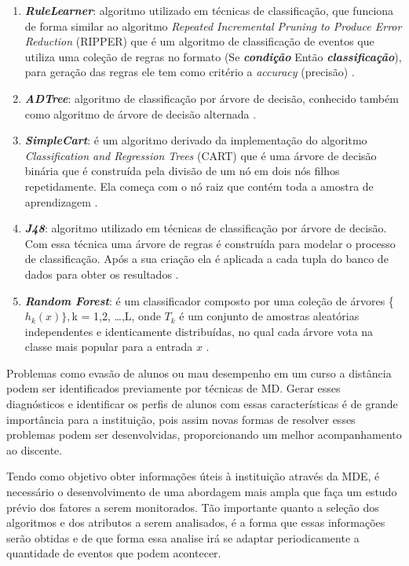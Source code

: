 \begin{enumerate}
\item \textbf{\textit{RuleLearner}}: algoritmo utilizado em técnicas de classificação, que funciona de forma similar ao algoritmo \textit{Repeated Incremental Pruning to Produce Error Reduction} (RIPPER) que é um algoritmo de classificação de eventos que utiliza uma coleção de regras no formato (Se \textbf{\textit{condição}} Então \textbf{\textit{classificação}}), para geração das regras ele tem como critério a \textit{accuracy} (precisão) \cite{cohen1995fast}.
\item \textbf{\textit{ADTree}}: algoritmo de classificação por árvore de decisão, conhecido também como algoritmo de árvore de decisão alternada \cite{freund1999alternating}.
\item \textbf{\textit{SimpleCart}}: é um algoritmo derivado da implementação do algoritmo \textit{Classification and Regression Trees} (CART) que é uma árvore de decisão binária que é construída pela divisão de um nó em dois nós filhos repetidamente. Ela começa com o nó raiz que contém toda a amostra de aprendizagem \cite{breiman1984classification}.
\item \textbf{\textit{J48}}: algoritmo utilizado em técnicas de classificação por  árvore de decisão. Com essa técnica uma árvore de regras é construída para  modelar o processo de classificação. Após a sua criação ela é aplicada a cada  tupla do banco de dados para obter os resultados \cite{quinlan2014c4}.
\item \textbf{\textit{Random Forest}}: é um classificador composto por uma coleção de árvores \{$h_{k}(x)\}, $k = 1,2, \ldots,L, onde $T_{k}$ é um conjunto de amostras aleatórias independentes e identicamente distribuídas, no qual cada árvore vota na classe mais popular para a entrada $x$ \cite{breiman2001random}.
\end{enumerate}

Problemas como evasão de alunos ou mau desempenho em um curso a distância podem ser identificados previamente por técnicas de MD. Gerar esses diagnósticos e identificar os perfis de alunos com essas características é de grande importância para a instituição, pois assim novas formas de resolver esses problemas podem ser desenvolvidas, proporcionando um melhor acompanhamento ao discente.

Tendo como objetivo obter informações úteis à instituição através da MDE, é necessário o desenvolvimento de uma abordagem mais ampla que faça um estudo prévio dos fatores a serem monitorados. Tão importante quanto a seleção dos algoritmos e dos atributos a serem analisados, é a forma que essas informações serão obtidas e de que forma essa analise irá se adaptar periodicamente a quantidade de eventos que podem acontecer.

